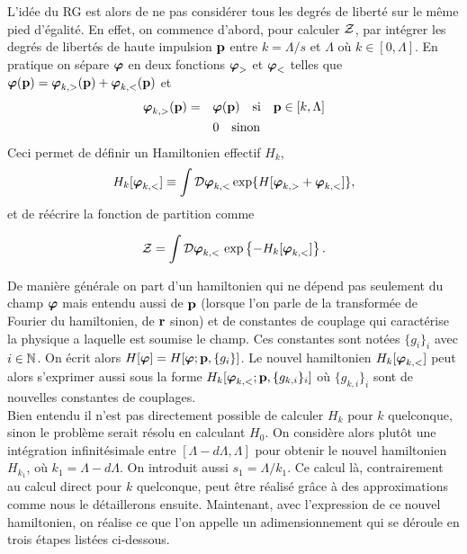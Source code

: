 \documentclass[10pt]{article}
\begin{document}
\begin{multicols}{2}
L'idée du RG est alors de ne pas considérer tous les degrés de liberté sur le même pied d'égalité. En effet, on commence d'abord, pour calculer $\mathcal{Z}$, par intégrer les degrés de libertés de haute impulsion ${\bf p}$ entre $k = \Lambda/s$ et $\Lambda$ où $k \in [0,\Lambda]$. En pratique on sépare $\boldsymbol{ \varphi}$ en deux fonctions $\boldsymbol{ \varphi}_>$ et $\boldsymbol{ \varphi}_<$ telles que $\boldsymbol{ \varphi}({\bf p}) = \boldsymbol{ \varphi}_{k,>}({\bf p}) + \boldsymbol{ \varphi}_{k,<}({\bf p})$ et
\begin{align}
	\boldsymbol{ \varphi}_{k,>}({\bf p})  = \quad & \boldsymbol{ \varphi}({\bf p}) \quad \text{si} \quad {\bf p} \in   [k,\Lambda] \\
	 & 0 \quad \text{sinon}
\end{align}
Ceci permet de définir un Hamiltonien effectif $H_k$, 
\begin{equation}
	H_k[\boldsymbol{ \varphi}_{k,<}] \equiv \int \mathcal{D} \boldsymbol{ \varphi}_{k,<}  \exp \{ H[\boldsymbol{ \varphi}_{k,>}+ \boldsymbol{ \varphi}_{k,<}] \},
\end{equation}
et de réécrire la fonction de partition comme 

\begin{equation}
\mathcal{Z} = \int \mathcal{D} \boldsymbol{ \varphi}_{k,<} \, \exp\left\{- H_k[\boldsymbol{ \varphi}_{k,<}]\right\}. 
\end{equation} 

De manière générale on part d'un hamiltonien qui ne dépend pas seulement du champ $\boldsymbol{ \varphi}$ mais entendu aussi  de ${\bf p}$ (lorsque l'on parle de la transformée de Fourier du hamiltonien, de ${\bf r}$ sinon) et de constantes de couplage qui caractérise la physique a laquelle est soumise le champ. Ces constantes sont notées $\{g_i\}_i$ avec $i \in \mathbb{N}$. On écrit alors $H[\boldsymbol{ \varphi}] = H[\boldsymbol{ \varphi} ; {\bf p}, \{g_i\}]$. Le nouvel hamiltonien $H_k[\boldsymbol{ \varphi}_{k,<}]$ peut alors s'exprimer aussi sous la forme $H_k[\boldsymbol{ \varphi}_{k,<} ; {\bf p}, \{g_{k,i}\}_i]$ où $\{g_{k,i}\}_i$ sont de nouvelles constantes de couplages. \\

Bien entendu il n'est pas directement possible de calculer $H_k$ pour $k$ quelconque, sinon le problème serait résolu en calculant $H_0$. On considère alors plutôt une intégration infinitésimale entre $[\Lambda - d\Lambda, \Lambda]$ pour obtenir le nouvel hamiltonien $H_{k_1}$, où $k_1 = \Lambda - d\Lambda$. On introduit aussi $s_1 = \Lambda/k_1$. Ce calcul là, contrairement au calcul direct pour $k$ quelconque, peut être réalisé grâce à des approximations comme nous le détaillerons ensuite. Maintenant, avec l'expression de ce nouvel hamiltonien, on réalise ce que l'on appelle un adimensionnement qui se déroule en trois étapes listées ci-dessous.


\end{multicols}
\end{document}
